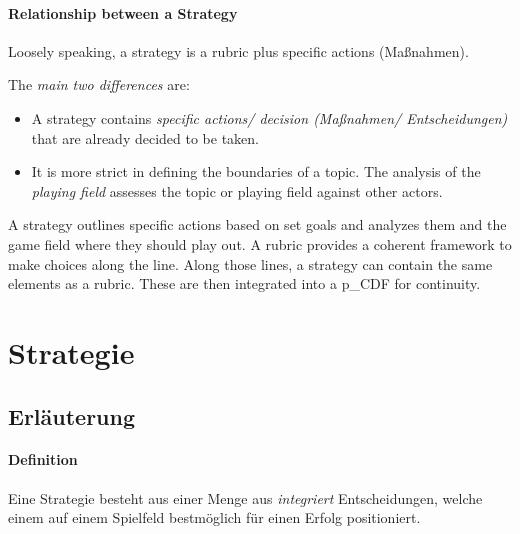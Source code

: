 \paragraph{Relationship between a Strategy}

Loosely speaking, a strategy is a rubric plus specific actions (Maßnahmen).

The \textit{main two differences} are:
\begin{itemize}
	\item A strategy contains \textit{specific actions/ decision (Maßnahmen/ Entscheidungen)} that are already decided to be taken.
	\item It is more strict in defining the boundaries of a topic. The analysis of the \textit{playing field} assesses the topic or playing field against other actors.
\end{itemize} 

A strategy outlines specific actions based on set goals and analyzes them and the game field where they should play out. A rubric provides a coherent framework to make choices along the line. Along those lines, a strategy can contain the same elements as a rubric. These are then integrated into a \gls{p_CDF} for continuity.

\section{Strategie} \label{Appendix_Erlaeuterung_Strategie}
\subsection{Erläuterung}
\paragraph{Definition}
Eine Strategie besteht aus einer Menge aus \textit{integriert} Entscheidungen, welche einem auf einem Spielfeld bestmöglich für einen Erfolg positioniert.\\




